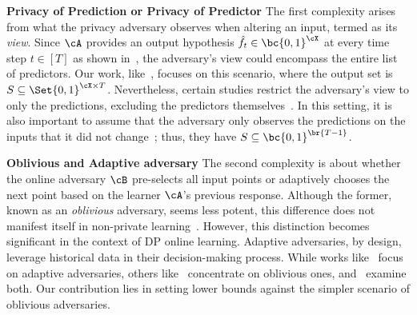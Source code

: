 \noindent\textbf{Privacy of Prediction or Privacy of Predictor} The first complexity arises from what the privacy adversary observes when altering an input, termed as its \emph{view}. Since \(\cA\) provides an output hypothesis \(\hat{f}_t\in\bc{0,1}^{\cX}\) at every time step \(t\in [T]\) as shown in~, the adversary's view could encompass the entire list of predictors. Our work, like~\citet{golowich2021littlestone}, focuses on this scenario, where the output set is \(S\subseteq \Set{0, 1}^{\cX \times T}\). Nevertheless, certain studies restrict the adversary's view to only the predictions, excluding the predictors themselves~\citep{beimel2013private, dwork2018privacy,naor2023private}. In this setting, it is also important to assume that the adversary only observes the predictions on the inputs that it did not change~\citep{kearns2015robust,kaplan2023black}; thus, they have \(S\subseteq\bc{0,1}^{\br{T-1}}\).

\noindent\textbf{Oblivious and Adaptive adversary} The second complexity is about whether the online adversary \(\cB\) pre-selects all input points or adaptively chooses the next point based on the learner \(\cA\)'s previous response. Although the former, known as an \emph{oblivious} adversary, seems less potent, this difference does not manifest itself in non-private learning~\citep{cesa2006prediction}. However, this distinction becomes significant in the context of DP online learning. Adaptive adversaries, by design, leverage historical data in their decision-making process.
While works like~\citet{kaplan2023black} focus on adaptive adversaries, others like~\citet{kearns2015robust} concentrate on oblivious ones, and~\citet{golowich2021littlestone} examine both. Our contribution lies in setting lower bounds against the simpler scenario of oblivious adversaries.

